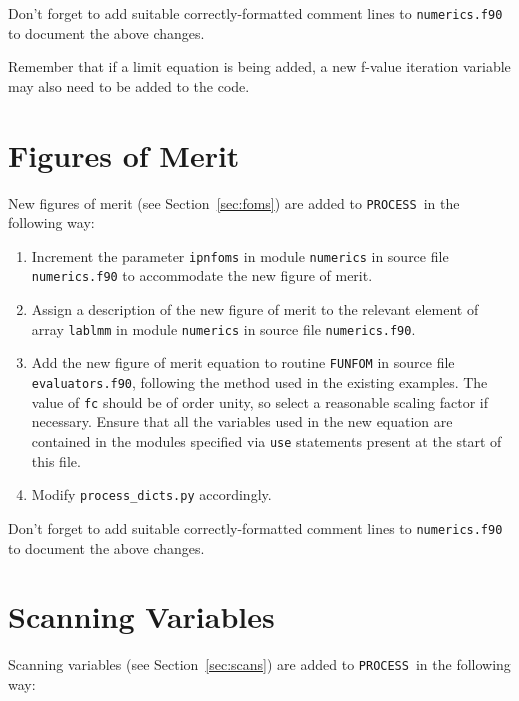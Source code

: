 \documentclass[11pt,a4paper]{report}
\newcommand{\process}{\mbox{\texttt{PROCESS}}}
\begin{document}
Don't forget to add suitable correctly-formatted comment lines to
\texttt{numerics.f90} to document the above changes.

Remember that if a limit equation is being added, a new f-value iteration
variable may also need to be added to the code.

\section{Figures of Merit}

New figures of merit (see Section~\ref{sec:foms}) are added to \process\ in
the following way:

\begin{enumerate}

\item Increment the parameter \texttt{ipnfoms} in module \texttt{numerics} in
  source file \texttt{numerics.f90} to accommodate the new figure of merit.

\item Assign a description of the new figure of merit to the relevant element
  of array \texttt{lablmm} in module \texttt{numerics} in source file
  \texttt{numerics.f90}.

\item Add the new figure of merit equation to routine \texttt{FUNFOM} in
  source file \texttt{evaluators.f90}, following the method used in the
  existing examples. The value of \texttt{fc} should be of order unity, so
  select a reasonable scaling factor if necessary. Ensure that all the
  variables used in the new equation are contained in the modules specified
  via \texttt{use} statements present at the start of this file.

\item Modify \texttt{process\_dicts.py} accordingly.

\end{enumerate}

Don't forget to add suitable correctly-formatted comment lines to
\texttt{numerics.f90} to document the above changes.

\section{Scanning Variables}

Scanning variables (see Section~\ref{sec:scans}) are added to \process\ in
the following way:
\end{document}
